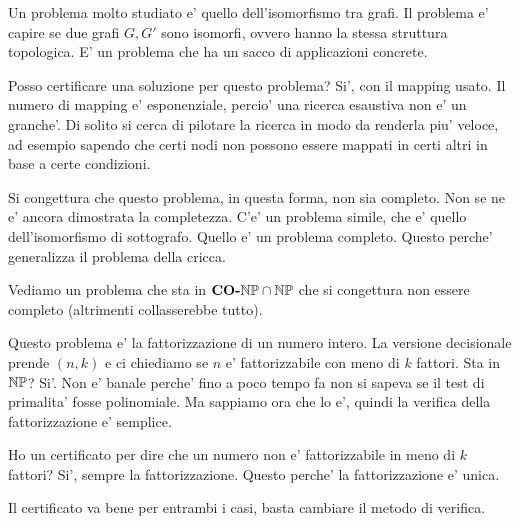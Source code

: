 Un problema molto studiato e' quello dell'isomorfismo tra grafi. Il problema e' capire se due grafi
$G,G'$ sono isomorfi, ovvero hanno la stessa struttura topologica. E' un problema che ha un sacco di
applicazioni concrete.

Posso certificare una soluzione per questo problema? Si', con il mapping usato. Il numero di mapping
e' esponenziale, percio' una ricerca esaustiva non e' un granche'. Di solito si cerca di pilotare la
ricerca in modo da renderla piu' veloce, ad esempio sapendo che certi nodi non possono essere
mappati in certi altri in base a certe condizioni.

Si congettura che questo problema, in questa forma, non sia completo. Non se ne e' ancora dimostrata
la completezza. C'e' un problema simile, che e' quello dell'isomorfismo di sottografo. Quello e' un
problema completo. Questo perche' generalizza il problema della cricca.

Vediamo un problema che sta in $\textbf{CO-}\mathbb{NP} \cap \mathbb{NP}$ che si congettura non essere completo
(altrimenti collasserebbe tutto).

Questo problema e' la fattorizzazione di un numero intero. La versione decisionale prende $(n,k)$ e
ci chiediamo se $n$ e' fattorizzabile con meno di $k$ fattori. Sta in $\mathbb{NP}$? Si'. Non e' banale
perche' fino a poco tempo fa non si sapeva se il test di primalita' fosse polinomiale. Ma sappiamo
ora che lo e', quindi la verifica della fattorizzazione e' semplice.

Ho un certificato per dire che un numero non e' fattorizzabile in meno di $k$ fattori? Si', sempre
la fattorizzazione. Questo perche' la fattorizzazione e' unica.

Il certificato va bene per entrambi i casi, basta cambiare il metodo di verifica.
